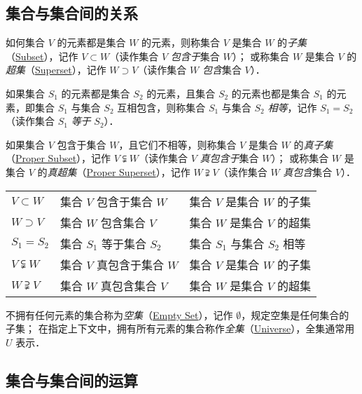 \subsection{集合与集合间的关系}

如何集合 $V$ 的元素都是集合 $W$ 的元素，则称集合 $V$ 是集合 $W$ 的\emph{子集}（\href{http://mathworld.wolfram.com/Subset.html}{Subset}），记作 $V\subset{}W$（读作集合 $V$ \emph{包含于}集合 $W$）；
或称集合 $W$ 是集合 $V$ 的\emph{超集}（\href{http://mathworld.wolfram.com/Superset.html}{Superset}），记作 $W\supset{}V$（读作集合 $W$ \emph{包含}集合 $V$）．

如果集合 $S_1$ 的元素都是集合 $S_2$ 的元素，且集合 $S_2$ 的元素也都是集合 $S_1$ 的元素，即集合 $S_1$ 与集合 $S_2$ 互相包含，则称集合 $S_1$ 与集合 $S_2$ \emph{相等}，记作 $S_1=S_2$（读作集合 $S_1$ \emph{等于} $S_2$）．

如果集合 $V$ 包含于集合 $W$，且它们不相等，则称集合 $V$ 是集合 $W$ 的\emph{真子集}（\href{http://mathworld.wolfram.com/ProperSubset.html}{Proper Subset}），记作 $V\subsetneqq{}W$（读作集合 $V$ \emph{真包含于}集合 $W$）；
或称集合 $W$ 是集合 $V$ 的\emph{真超集}（\href{http://mathworld.wolfram.com/ProperSuperset.html}{Proper Superset}），记作 $W\supsetneqq{}V$（读作集合 $W$ \emph{真包含}集合 $V$）．

\begin{table}[h]
	\centering
	\begin{tabular}{l l l}
		\hline
		$V\subset{}W$     & 集合 $V$ 包含于集合 $W$   & 集合 $V$ 是集合 $W$ 的子集   \\
		$W\supset{}V$     & 集合 $W$ 包含集合 $V$     & 集合 $W$ 是集合 $V$ 的超集   \\
		$S_1=S_2$         & 集合 $S_1$ 等于集合 $S_2$ & 集合 $S_1$ 与集合 $S_2$ 相等 \\
		$V\subsetneqq{}W$ & 集合 $V$ 真包含于集合 $W$ & 集合 $V$ 是集合 $W$ 的子集   \\
		$W\supsetneqq{}V$ & 集合 $W$ 真包含集合 $V$   & 集合 $W$ 是集合 $V$ 的超集   \\
		\hline
	\end{tabular}
\end{table}

不拥有任何元素的集合称为\emph{空集}（\href{http://mathworld.wolfram.com/EmptySet.html}{Empty Set}），记作 $\emptyset$，规定空集是任何集合的子集；
在指定上下文中，拥有所有元素的集合称作\emph{全集}（\href{http://mathworld.wolfram.com/UniversalSet.html}{Universe}），全集通常用 $U$ 表示．

\subsection{集合与集合间的运算}

